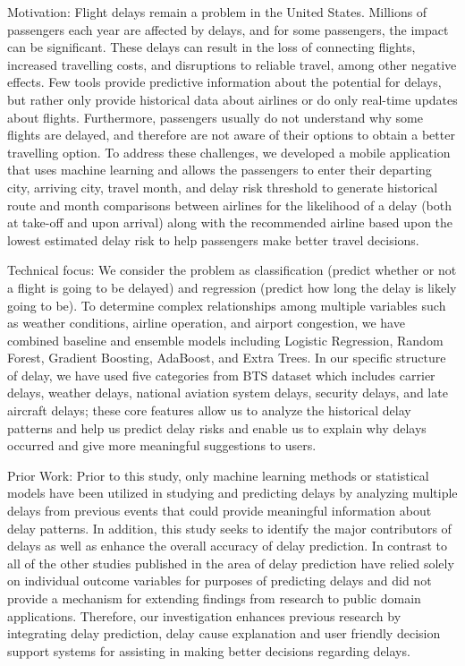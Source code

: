 Motivation: 
Flight delays remain a problem in the United States. Millions of passengers each year are affected by delays, and for some passengers, the impact can be significant. These delays can result in the loss of connecting flights, increased travelling costs, and disruptions to reliable travel, among other negative effects. Few tools provide predictive information about the potential for delays, but rather only provide historical data about airlines or do only real-time updates about flights. Furthermore, passengers usually do not understand why some flights are delayed, and therefore are not aware of their options to obtain a better travelling option. To address these challenges, we developed a mobile application that uses machine learning and allows the passengers to enter their departing city, arriving city, travel month, and delay risk threshold to generate historical route and month comparisons between airlines for the likelihood of a delay (both at take-off and upon arrival) along with the recommended airline based upon the lowest estimated delay risk to help passengers make better travel decisions.

Technical focus: We consider the problem as classification (predict whether or not a flight is going to be delayed) and regression (predict how long the delay is likely going to be). To determine complex relationships among multiple variables such as weather conditions, airline operation, and airport congestion, we have combined baseline and ensemble models including Logistic Regression, Random Forest, Gradient Boosting, AdaBoost, and Extra Trees. In our specific structure of delay, we have used five categories from BTS dataset which includes carrier delays, weather delays, national aviation system delays, security delays, and late aircraft delays; these core features allow us to analyze the historical delay patterns and help us predict delay risks and enable us to explain why delays occurred and give more meaningful suggestions to users.


Prior Work: Prior to this study, only machine learning methods or statistical models have been utilized in studying and predicting delays by analyzing multiple delays from previous events that could provide meaningful information about delay patterns. In addition, this study seeks to identify the major contributors of delays as well as enhance the overall accuracy of delay prediction. In contrast to all of the other studies published in the area of delay prediction have relied solely on individual outcome variables for purposes of predicting delays and did not provide a mechanism for extending findings from research to public domain applications. Therefore, our investigation enhances previous research by integrating delay prediction, delay cause explanation and user friendly decision support systems for assisting in making better decisions regarding delays.


